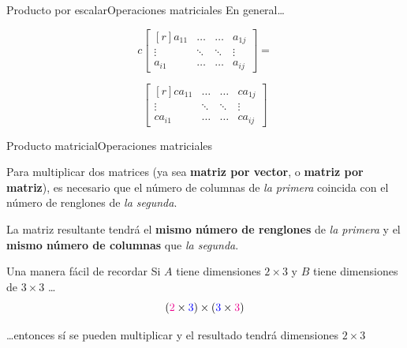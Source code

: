 \documentclass[spanish, c]{beamer}
\begin{document}
\begin{frame}{Producto por escalar}{Operaciones matriciales}
    En general\dots

    \[%
        c
        \begin{bmatrix*}[r]
            a_{11} & \dots & \dots & a_{1j} \\
            \vdots & \ddots & \ddots & \vdots \\
            a_{i1} & \dots & \dots & a_{ij}
        \end{bmatrix*} =
    \]

    \bigskip

    \[%
        \begin{bmatrix*}[r]
            ca_{11} & \dots & \dots & ca_{1j} \\
            \vdots & \ddots & \ddots & \vdots \\
            ca_{i1} & \dots & \dots & ca_{ij}
        \end{bmatrix*}
    \]
    
\end{frame}

\begin{frame}{Producto matricial}{Operaciones matriciales}

    Para multiplicar dos matrices (ya sea \textbf{matriz por vector}, o \textbf{matriz por matriz}), es necesario que el \alert{número de columnas} de \textit{la primera} \alert{coincida} con el \alert{número de renglones} de \textit{la segunda}. \pause
    
    \bigskip
    
    La matriz resultante tendrá el \textbf{mismo número de renglones} de \textit{la primera} y el \textbf{mismo número de columnas} que \textit{la segunda}. \pause

    \bigskip

    \begin{exampleblock}{Una manera fácil de recordar}
        Si $A$ tiene dimensiones $2 \times 3$ y $B$ tiene dimensiones de $3 \times 3$ \dots
        \[({\color{magenta} 2} \times {\color{blue} 3}) \times ({\color{blue} 3} \times {\color{magenta} 3})\]

        \dots entonces {\color{blue} sí se pueden multiplicar} y el resultado tendrá {\color{magenta} dimensiones $2 \times 3$}
    \end{exampleblock}

\end{frame}
\end{document}
